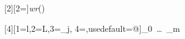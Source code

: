 \newcommand{\hernan}[1]{{\marginpar{\cf{6}{{HM: #1}}}}}

\newcommand{\ignorar}[1]{}



\newcommand{\type}{\mathcal{T}}
\newcommand{\patternmtch}{\owedge}
\newcommand{\tjudge}[4]{#1 \vdash #2 : {#3} ,#4}


\newcommand{\equref}[1]{Eq.~\eqref{#1}}
\newcommand{\thmref}[1]{Thm.~\ref{#1}}
\newcommand{\lemref}[1]{Lem.~\ref{#1}}
\newcommand{\lemrefprop}[2]{Lem.~\ref{#1} (\ref{#2})}
\newcommand{\figref}[1]{Fig.~\ref{#1}}
\newcommand{\defref}[1]{Def.~\ref{#1}}
\newcommand{\secref}[1]{\S~\ref{#1}}
\newcommand{\exref}[1]{Ex.~\ref{#1}}
\newcommand{\propref}[1]{Prop.~\ref{#1}}
\newcommand{\corref}[1]{Cor.~\ref{#1}}





\newcommand{\changed}[2]{\textcolor{blue}{#2}}
\newcommand{\henote}[1]{\textcolor{red}{[H: #1]}}
\newcommand{\chnote}[1]{\textcolor{blue}{[C: #1]}}

\newcommand{\flatten}[1]{\textcolor{Orange}{\underline{#1}}}

\newcommand{\length}[1]{|#1|}

[2][2=\vertice]{\textcolor{OliveGreen}{\textit{wr}(\udec[{#1}])}}


\newcommand{\paralelo}[4]{\parallel_{#1\in #2} {#3} \parallel \ #4}


[4][1=l,2=L,3=\Absclient_j, 4=\queuemessage,usedefault=@]{\Absclient_0\ \bigpar \ldots\bigpar\  \Absclient_m\ \bigpar\ \queuemessage}


